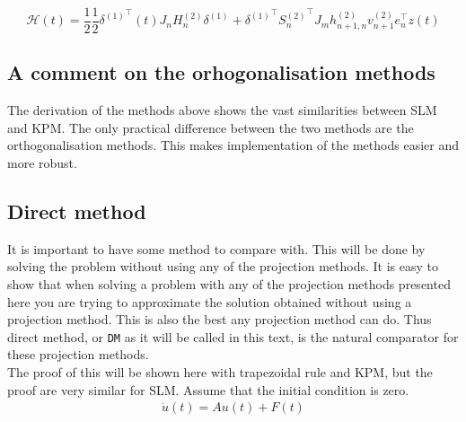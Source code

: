 \begin{equation}
\mathcal{H} (t) = \frac{1}{2} \frac{1}{2} {\delta^{(1)}}^\top (t) J_n H_n^{(2)} \delta^{(1)} + {\delta^{(1)}}^\top {S_n^{(2)}}^\top  J_m h_{n+1,n}^{(2)} v_{n+1}^{(2)} e_n^\top z(t)
\label{eqn:energy4}
\end{equation}
\subsection{A comment on the orhogonalisation methods} %
The  derivation of the methods above shows the vast similarities between SLM and KPM. The only practical difference between the two methods are the orthogonalisation methods. This makes implementation of the methods easier and more robust.
\subsection{Direct method}
It is important to have some method to compare with. This will be done by solving the problem without using any of the projection methods. It is easy to show that when solving a problem with any of the projection methods presented here you are trying to approximate the solution obtained without using a projection method. This is also the best any projection method can do. Thus direct method, or \texttt{DM} as it will be called in this text, is the natural comparator for these projection methods.\\

The proof of this will be shown here with trapezoidal rule and KPM, but the proof are very similar for SLM. Assume that the initial condition is zero.\\

\begin{equation}
\begin{aligned}
\dot{u}(t) = Au(t) + F(t)
\end{aligned}
\end{equation}


